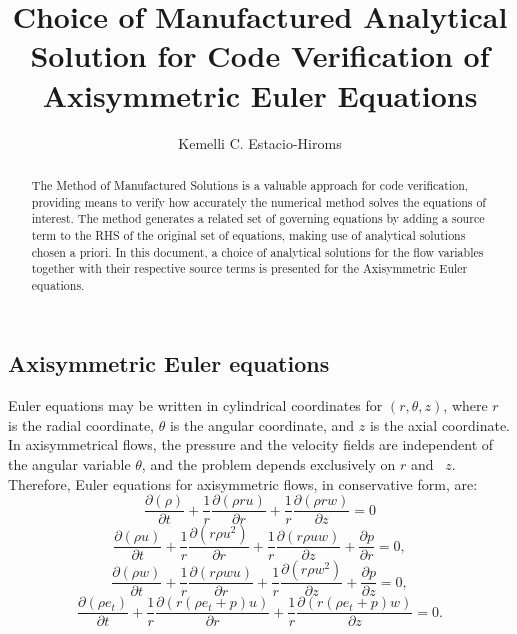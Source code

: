 \documentclass[a4paper,10pt]{article}
\title{Choice of Manufactured Analytical Solution for Code Verification of Axisymmetric Euler Equations}
\author{Kemelli C. Estacio-Hiroms}
\newcommand{\Diff}[2] {\dfrac{\partial( #1)}{\partial #2}}
\newcommand{\diff}[2] {\dfrac{\partial #1}{\partial #2}}
\begin{document}
\begin{landscape}
 
\maketitle

\begin{abstract}
The Method of Manufactured Solutions is a valuable approach for code verification, providing means to verify how accurately the numerical method solves the equations of interest. The method generates a related set of governing equations by adding a source term to the RHS of the original set of equations, making use of analytical solutions chosen a priori.  In this document,  a choice of analytical solutions for the flow variables together with their respective source terms is presented for the Axisymmetric Euler equations.
\end{abstract}

\section{Axisymmetric Euler equations}

Euler equations may be written in cylindrical coordinates for $(r,\theta,z)$, where $r$ is the radial coordinate, $\theta$ is the angular coordinate, and $z$ is the axial coordinate. In axisymmetrical flows, the pressure and the velocity fields are independent of the angular variable $\theta$, and the problem depends exclusively on $r$ and~ $z$. Therefore, Euler equations for axisymmetric flows, in conservative form,  are:
\begin{equation}
 \label{eq:ns_c_01}
\Diff{\rho}{t}+ \dfrac{1}{r} \Diff{\rho r u}{r}+ \dfrac{1}{r}\Diff{\rho r w}{z}=0
\end{equation}
\begin{equation}
\label{eq:ns_c_02}
\Diff{\rho u}{t} +\dfrac{1}{r}\Diff{r \rho u^2 }{r}+ \dfrac{1}{r}\Diff{r \rho u w}{z}+\diff{p}{r}=0,
\end{equation}
\begin{equation}
\label{eq:ns_c_03}
\Diff{\rho w}{t} + \dfrac{1}{r}\Diff{r \rho w u }{r}+ \dfrac{1}{r}\Diff{r \rho w^2 }{z}+\diff{p}{z}=0,
\end{equation}
\begin{equation}
\label{eq:ns_c_04}
\Diff{\rho e_t}{ t}+\dfrac{1}{r}\Diff{r(\rho e_t+p) u}{ r}+\dfrac{1}{r}\Diff{r(\rho e_t+p)w}{z}=0.
\end{equation}



\end{landscape}
\end{document}
